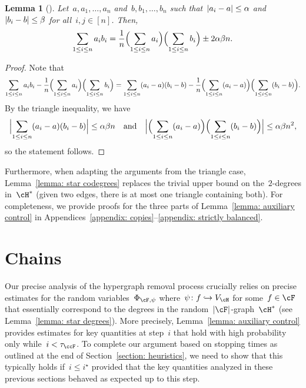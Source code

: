 \documentclass[11pt]{amsart}
\DeclarePairedDelimiter{\paren}{\lparen}{\rparen}
\DeclarePairedDelimiter{\abs}{\lvert}{\rvert}
\newcommand{\qtand}{\quad\text{and}\quad}
\newcommand{\injection}{\hookrightarrow}
\newtheorem{lemma}[algocf]{Lemma}
\theoremstyle{definition}
\numberwithin{equation}{section}
\begin{document}
	\begin{lemma}[{\cite[Lemma~3.1]{BB:19}}]\label{lemma: averaging}
		Let~$a,a_1,\ldots,a_n$ and~$b,b_1,\ldots,b_n$ such that~$\abs{a_i-a}\leq \alpha$ and~$\abs{b_i-b}\leq \beta$ for all~$i,j\in[n]$.
		Then,
		\begin{equation*}
			\sum_{1\leq i\leq n}a_ib_i
			= \frac{1}{n}\paren[\Big]{\sum_{1\leq i\leq n}a_i}\paren[\Big]{\sum_{1\leq i\leq n}b_i} \pm 2\alpha\beta n.
		\end{equation*}
	\end{lemma}
	\begin{proof}
		Note that
		\begin{equation*}
			\sum_{1\leq i\leq n}a_ib_i-\frac{1}{n}\paren[\Big]{\sum_{1\leq i\leq n}a_i}\paren[\Big]{\sum_{1\leq i\leq n}b_i}
			=\sum_{1\leq i\leq n} (a_i-a)(b_i-b)-\frac{1}{n}\paren[\Big]{\sum_{1\leq i\leq n}(a_i-a)}\paren[\Big]{\sum_{1\leq i\leq n}(b_i-b)}.
		\end{equation*}
		By the triangle inequality, we have
		\begin{equation*}
			\abs[\Big]{\sum_{1\leq i\leq n} (a_i-a)(b_i-b)}\leq \alpha\beta n
			\qtand
			\abs[\Big]{\paren[\Big]{\sum_{1\leq i\leq n}(a_i-a)}\paren[\Big]{\sum_{1\leq i\leq n}(b_i-b)}}\leq \alpha\beta n^2,
		\end{equation*}
		so the statement follows.
	\end{proof}
	
	Furthermore, when adapting the arguments from the triangle case, Lemma~\ref{lemma: star codegrees} replaces the trivial upper bound on the~$2$-degrees in~$\cH^*$ (given two edges, there is at most one triangle containing both).
	For completeness, we provide proofs for the three parts of Lemma~\ref{lemma: auxiliary control} in Appendices~\ref{appendix: copies}--\ref{appendix: strictly balanced}.
	
	
	
	
	
\section{Chains}\label{section: chains}
	
	Our precise analysis of the hypergraph removal process crucially relies on precise estimates for the random variables~$\Phi_{\cF,\psi}$ where~$\psi\colon f\injection V_\cH$ for some~$f\in\cF$ that essentially correspond to the degrees in the random~$\abs{\cF}$-graph~$\cH^*$ (see Lemma~\ref{lemma: star degrees}).
	More precisely, Lemma~\ref{lemma: auxiliary control} provides estimates for key quantities at step~$i$ that hold with high probability only while~$i<\tau_\ccF$.
	To complete our argument based on stopping times as outlined at the end of Section~\ref{section: heuristics}, we need to show that this typically holds if~$i\leq i^\star$ provided that the key quantities analyzed in these previous sections behaved as expected up to this step.
	
\end{document}
